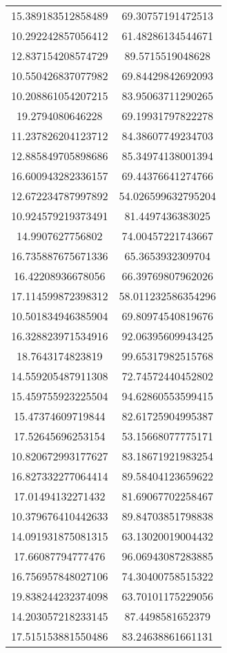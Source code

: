 \begin{table}
\begin{tabular}{cc}
15.389183512858489 & 69.30757191472513 \\
10.292242857056412 & 61.48286134544671 \\
12.837154208574729 & 89.5715519048628 \\
10.550426837077982 & 69.84429842692093 \\
10.208861054207215 & 83.95063711290265 \\
19.2794080646228 & 69.19931797822278 \\
11.237826204123712 & 84.38607749234703 \\
12.885849705898686 & 85.34974138001394 \\
16.600943282336157 & 69.44376641274766 \\
12.672234787997892 & 54.026599632795204 \\
10.924579219373491 & 81.4497436383025 \\
14.9907627756802 & 74.00457221743667 \\
16.735887675671336 & 65.3653932309704 \\
16.42208936678056 & 66.39769807962026 \\
17.114599872398312 & 58.011232586354296 \\
10.501834946385904 & 69.80974540819676 \\
16.328823971534916 & 92.06395609943425 \\
18.7643174823819 & 99.65317982515768 \\
14.559205487911308 & 72.74572440452802 \\
15.459755923225504 & 94.62860553599415 \\
15.47374609719844 & 82.61725904995387 \\
17.52645696253154 & 53.15668077775171 \\
10.820672993177627 & 83.18671921983254 \\
16.827332277064414 & 89.58404123659622 \\
17.01494132271432 & 81.69067702258467 \\
10.379676410442633 & 89.84703851798838 \\
14.091931875081315 & 63.13020019004432 \\
17.66087794777476 & 96.06943087283885 \\
16.756957848027106 & 74.30400758515322 \\
19.838244232374098 & 63.70101175229056 \\
14.203057218233145 & 87.4498581652379 \\
17.515153881550486 & 83.24638861661131 \\

\end{tabular}
\end{table}
